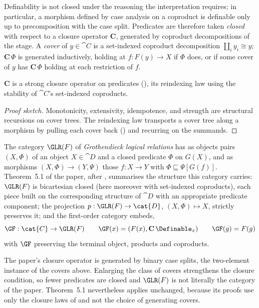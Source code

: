 Definability is not closed under the reasoning the interpretation requires; in particular, a morphism
defined by case analysis on a coproduct is definable only up to precomposition with the case split.
Predicates are therefore taken \emph{closed} with respect to a closure operator $\mathbf{C}$,
generated by coproduct decompositions of the stage. A \emph{cover} of $y \in \cat{C}$ is a
set-indexed coproduct decomposition $\coprod_i y_i \cong y$; $\mathbf{C}\,\Phi$ is generated
inductively, holding at $f : F(y) \to X$ if $\Phi$ does, or if some cover of $y$ has
$\mathbf{C}\,\Phi$ holding at each restriction of $f$.

\begin{lemma}
\label{lem:conservativity:indexed-closure}
$\mathbf{C}$ is a strong closure operator on predicates (), its
reindexing law using the stability of $\cat{C}$'s set-indexed coproducts.
\end{lemma}

\begin{proof}[Proof sketch]
Monotonicity, extensivity, idempotence, and strength are structural recursions on cover trees.
The reindexing law transports a cover tree along a morphism by pulling each cover back
() and recurring on the summands.
\end{proof}

The category $\GLR(F)$ of \emph{Grothendieck logical relations} has as objects pairs $(X, \Phi)$ of an
object $X \in \cat{D}$ and a closed predicate $\Phi$ on $G(X)$, and as morphisms $(X, \Phi) \to (Y,
\Psi)$ those $f : X \to Y$ with $\Phi \sqsubseteq \Psi[G(f)]$. Theorem~5.1 of the paper, after \citet{fiore-simpson99},
summarises the structure this category carries: $\GLR(F)$ is bicartesian closed
(here moreover with set-indexed coproducts), each piece built on the corresponding structure of
$\cat{D}$ with an appropriate predicate component; the projection $p : \GLR(F) \to \cat{D}$, $(X,
\Phi) \mapsto X$, strictly preserves it; and the first-order category embeds,
\[
  \GF : \cat{C} \to \GLR(F) \qquad \GF(x) = (F(x), \mathbf{C}\,\Definable_x) \qquad \GF(g) = F(g)
\]
with $\GF$ preserving the terminal object, products and coproducts.

The paper's closure operator is generated by binary case splits, the two-element instance of
the covers above. Enlarging the class of covers strengthens the closure condition, so fewer
predicates are closed and $\GLR(F)$ is not literally the category of the paper. Theorem~5.1
nevertheless applies unchanged, because its proofs use only the closure laws of
 and not the choice of generating covers.

